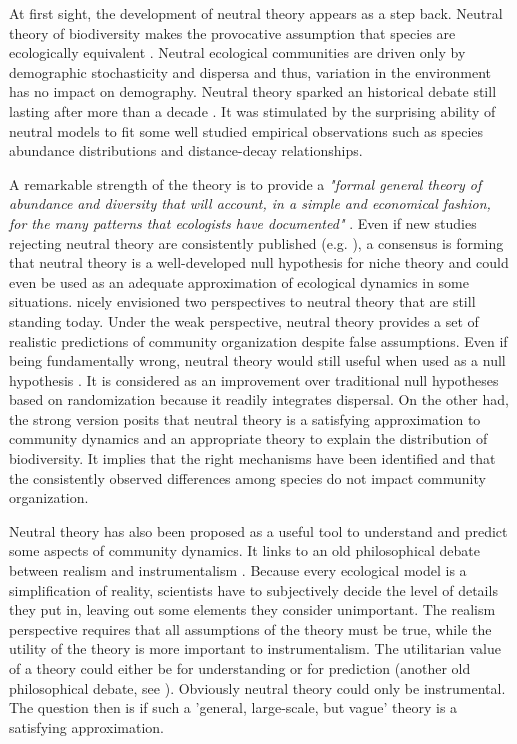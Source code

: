 \documentclass[12pt]{article}
\begin{document}
At first sight, the development of neutral theory appears as a step back.
Neutral theory of biodiversity makes the provocative assumption that species are
ecologically equivalent \parencite{Bell2000,Hubbell2001}. Neutral ecological communities are
driven only by demographic stochasticity and dispersa and thus, variation in the environment has no impact on
demography. Neutral theory sparked
an historical debate still lasting after more than a decade
\parencite{Chave2004, Etiennee2011, Rosindell2012,Clark2012}. It was stimulated
by the surprising ability of neutral models to fit some well studied empirical
observations such as species abundance distributions and distance-decay
relationships. 

A remarkable strength of the theory is to provide a \emph{"formal general theory
of abundance and diversity that will account, in a simple and economical
fashion, for the many patterns that ecologists have documented"}
\parencite{Bell2001}. Even if new studies rejecting neutral theory are
consistently published (e.g. \textcite{Ricklefs2012}), a consensus is forming
that neutral theory is a well-developed null hypothesis for niche theory and
could even be used as an adequate approximation of ecological dynamics in some
situations. \textcite{Bell2001} nicely envisioned two perspectives to neutral
theory that are still standing today. Under the weak perspective, neutral theory
provides a set of realistic predictions of community organization despite false
assumptions. Even if being fundamentally wrong, neutral theory would still
useful when used as a null hypothesis \parencite{Gotelli2006}. It is considered
as an improvement over traditional null hypotheses based on randomization
\parencite{Gotelli2000} because it readily integrates dispersal. On the other
had, the strong version posits that neutral theory is a satisfying approximation
to community dynamics and an appropriate theory to explain the distribution of
biodiversity. It implies that the right mechanisms have been identified and that
the consistently observed differences among species do not impact community
organization.

Neutral theory has also been proposed as a useful tool to understand and predict
some aspects of community dynamics. It links to an old philosophical debate
between realism and instrumentalism \parencite{Wennekes2011}. Because every
ecological model is a simplification of reality, scientists have to subjectively
decide the level of details they put in, leaving out some elements they consider
unimportant. The realism perspective requires that all assumptions of the theory
must be true, while the utility of the theory is more important to
instrumentalism. The utilitarian value of a theory could either be for
understanding or for prediction (another old philosophical debate, see
\textcite{Schmueli2010}). Obviously neutral theory could only be instrumental.
The question then is if such a 'general, large-scale, but vague' theory
\parencite{Wennekes2011} is a satisfying approximation.
\end{document}
